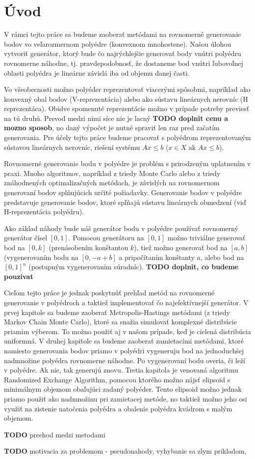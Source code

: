 \chapter*{Úvod} %

V rámci tejto práce sa budeme zaoberať metódami na rovnomerné generovanie bodov vo veľarozmernom polyédre (konvexnom mnohostene). Našou úlohou vytvoriť generátor, ktorý bude čo najrýchlejšie generovať body vnútri polyédru rovnomerne náhodne, tj. pravdepodobnosť, že dostaneme bod vnútri ľubovoľnej oblasti polyédra je lineárne závislá iba od objemu danej časti.

Vo všeobecnosti možno polyéder reprezentovať viacerými spôsobmi, napríklad ako konvexný obal bodov (V-reprezentácia) alebo ako sústavu lineárnych nerovníc (H reprezentáca). Obidve spomenuté reprezentácie možno v prípade potreby previesť na tú druhú. Prevod medzi nimi síce nie je lacný \textbf{TODO doplnit cenu a mozno sposob}, no daný výpočet je nutné spraviť len raz pred začatím generovania. Pre účely tejto práce budeme pracovať s polyédrom reprezentovaným sústavou lineárnych nerovníc, riešení systému $Ax \leq b$ ($x \in X$ ak $Ax \leq b$).

Rovnomerné generovanie bodu v polyédre je problém s prirodzeným uplatnením v praxi. Mnoho algoritmov, napríklad z triedy Monte Carlo alebo z triedy znáhodnených optimalizačných metódach, je závislých na rovnomernom generovaní bodov splňujúcich určité požiadavky.
Generovanie bodov v polyédre predstavuje generovanie bodov, ktoré spľňajú sústavu lineárnych obmedzení (viď H-reprezentácia polyédru).

Ako základ náhody bude náš generátor bodu v polyédre používať rovnomerný generátor čísel $[0,1]$. Pomocou generátoru na $[0,1]$ možno triviálne generovať bod na $[0,k]$ (prenásobením konštantou $k$), tiež možno generovať bod na $[a,b]$ (vygenerovaním bodu na $[0, -a+b]$ a pripočítaním konštanty $a$, alebo bod na $[0,1]^n$ (postupným vygenerovaním súradníc). \textbf{TODO doplnit, co budeme pouzivat}

Cieľom tejto práce je jednak poskytnúť prehľad metód na rovnomerné generovanie v polyédroch a taktiež implementovať čo najefektívnejší generátor.
V prvej kapitole sa budeme zaoberať Metropolis-Hastings metódami (z triedy Markov Chain Monte Carlo), ktoré sa snažia simulovať komplexné distribúcie priamim výberom. To možno použiť aj v našom prípade, keď je cielená distribúcia uniformná.
V druhej kapitole sa budeme zaoberať zamietacími metódami, ktoré namiesto generovania bodov priamo v polyédri vygeneruju bod na jednoduchšej nadmnožine polyédra rovnomerne náhodne. Po vygenerovaní bodu overia, či leží v polyédre. Ak nie, tak generujú znovu.
Tretia kapitola je venovaná algoritmu Randomized Exchange Algorithm, pomocou ktorého možno nájsť elipsoid s minimálnym objemom obaľujúci zadaný polyéder. Tento elipsoid možno jednak priamo použiť ako nadmnožinu pri zamietacej metóde, no taktiež možno jeho osi využiť na zistenie natočenia polyédra a obalenie polyédra kvádrom s malým objemom.

\textbf{TODO} prechod medzi metodami

\textbf{TODO} motivacia za problemom - pseudonahody, vyhybanie sa zlym prikladom,
